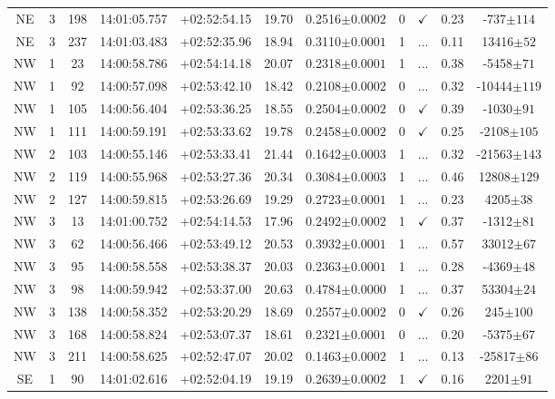 \begin{landscape}
\begin{longtable}{ccccccccccc}
	NE & 3 & 198 & 14:01:05.757 & +02:52:54.15 & 19.70 & 0.2516$\pm{0.0002}$ & 0 & $\checkmark$ & 0.23 & -737$\pm{114}$ \\
	NE & 3 & 237 & 14:01:03.483 & +02:52:35.96 & 18.94 & 0.3110$\pm{0.0001}$ & 1 & ... & 0.11 & 13416$\pm{52}$ \\
	NW & 1 & 23 & 14:00:58.786 & +02:54:14.18 & 20.07 & 0.2318$\pm{0.0001}$ & 1 & ... & 0.38 & -5458$\pm{71}$ \\
	NW & 1 & 92 & 14:00:57.098 & +02:53:42.10 & 18.42 & 0.2108$\pm{0.0002}$ & 0 & ... & 0.32 & -10444$\pm{119}$ \\
	NW & 1 & 105 & 14:00:56.404 & +02:53:36.25 & 18.55 & 0.2504$\pm{0.0002}$ & 0 & $\checkmark$ & 0.39 & -1030$\pm{91}$ \\
	NW & 1 & 111 & 14:00:59.191 & +02:53:33.62 & 19.78 & 0.2458$\pm{0.0002}$ & 0 & $\checkmark$ & 0.25 & -2108$\pm{105}$ \\
	NW & 2 & 103 & 14:00:55.146 & +02:53:33.41 & 21.44 & 0.1642$\pm{0.0003}$ & 1 & ... & 0.32 & -21563$\pm{143}$ \\
	NW & 2 & 119 & 14:00:55.968 & +02:53:27.36 & 20.34 & 0.3084$\pm{0.0003}$ & 1 & ... & 0.46 & 12808$\pm{129}$ \\
	NW & 2 & 127 & 14:00:59.815 & +02:53:26.69 & 19.29 & 0.2723$\pm{0.0001}$ & 1 & ... & 0.23 & 4205$\pm{38}$ \\
	NW & 3 & 13 & 14:01:00.752 & +02:54:14.53 & 17.96 & 0.2492$\pm{0.0002}$ & 1 & $\checkmark$ & 0.37 & -1312$\pm{81}$ \\
	NW & 3 & 62 & 14:00:56.466 & +02:53:49.12 & 20.53 & 0.3932$\pm{0.0001}$ & 1 & ... & 0.57 & 33012$\pm{67}$ \\
	NW & 3 & 95 & 14:00:58.558 & +02:53:38.37 & 20.03 & 0.2363$\pm{0.0001}$ & 1 & ... & 0.28 & -4369$\pm{48}$ \\
	NW & 3 & 98 & 14:00:59.942 & +02:53:37.00 & 20.63 & 0.4784$\pm{0.0000}$ & 1 & ... & 0.37 & 53304$\pm{24}$ \\
	NW & 3 & 138 & 14:00:58.352 & +02:53:20.29 & 18.69 & 0.2557$\pm{0.0002}$ & 0 & $\checkmark$ & 0.26 & 245$\pm{100}$ \\
	NW & 3 & 168 & 14:00:58.824 & +02:53:07.37 & 18.61 & 0.2321$\pm{0.0001}$ & 0 & ... & 0.20 & -5375$\pm{67}$ \\
	NW & 3 & 211 & 14:00:58.625 & +02:52:47.07 & 20.02 & 0.1463$\pm{0.0002}$ & 1 & ... & 0.13 & -25817$\pm{86}$ \\
	SE & 1 & 90 & 14:01:02.616 & +02:52:04.19 & 19.19 & 0.2639$\pm{0.0002}$ & 1 & $\checkmark$ & 0.16 & 2201$\pm{91}$ \\

\end{longtable}
\end{landscape}
